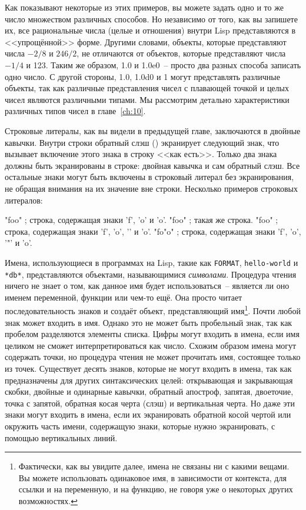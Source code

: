 Как показывают некоторые из этих примеров, вы можете задать одно и то же число множеством
различных способов. Но независимо от того, как вы запишете их, все рациональные числа
(целые и отношения) внутри Lisp представляются в <<упрощённой>> форме. Другими словами,
объекты, которые представляют числа $-2/8$ и $246/2$, не отличаются от объектов, которые
представляют числа $-1/4$ и 123. Таким же образом, 1.0 и 1.0e0~-- просто два разных способа
записать одно число. С другой стороны, 1.0, 1.0d0 и 1 могут представлять различные
объекты, так как различные представления чисел с плавающей точкой и целых чисел являются
различными типами. Мы рассмотрим детально характеристики различных типов чисел в главе~\ref{ch:10}.

Строковые литералы, как вы видели в предыдущей главе, заключаются в двойные
кавычки. Внутри строки обратный слэш (\bslash) экранирует следующий знак, что
вызывает включение этого знака в строку <<как есть>>. Только два знака должны быть
экранированы в строке: двойная кавычка и сам обратный слэш. Все остальные знаки могут быть
включены в строковый литерал без экранирования, не обращая внимания на их значение вне
строки. Несколько примеров строковых литералов:

\begin{myverb}
  "foo"     ; строка, содержащая знаки 'f', 'o' и 'o'.
  "fo\bslash{}o"    ; такая же строка.
  "fo\bslash{}\bslash{}o"   ; строка, содержащая знаки 'f', 'o', '\bslash{}' и 'o'.
  "fo\bslash{}"o"   ; строка, содержащая знаки 'f', 'o', '"' и 'o'.
\end{myverb}

Имена, использующиеся в программах на Lisp, такие как \lstinline{FORMAT}, \lstinline{hello-world}
и \lstinline{*db*}, представляются объектами, называющимися \textit{символами}. Процедура чтения
ничего не знает о том, как данное имя будет использоваться~-- является ли оно именем
переменной, функции или чем-то ещё. Она просто читает последовательность знаков и создаёт
объект, представляющий имя\footnote{Фактически, как вы увидите далее, имена не
  связаны ни с какими вещами. Вы можете использовать одинаковое имя, в зависимости от
  контекста, для ссылки и на переменную, и на функцию, не говоря уже о некоторых других
  возможностях.}. Почти любой знак может входить в имя. Однако это не может быть
пробельный знак, так как пробелом разделяются элементы списка. Цифры могут входить в
имена, если имя целиком не сможет интерпретироваться как число. Схожим образом имена
могут содержать точки, но процедура чтения не может прочитать имя, состоящее только из
точек. Существует десять знаков, которые не могут входить в имена, так как предназначены
для других синтаксических целей: открывающая и закрывающая скобки, двойные и одинарные
кавычки, обратный апостроф, запятая, двоеточие, точка с запятой, обратная косая черта
(слэш) и вертикальная черта. Но даже эти знаки могут входить в имена, если их экранировать
обратной косой чертой или окружить часть имени, содержащую знаки, которые нужно
экранировать, с помощью вертикальных линий.

